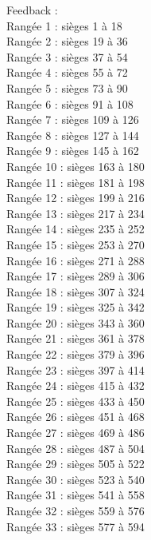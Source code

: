 \documentclass[letterpaper, 12pt]{article}
\begin{document}
Feedback : \\
Rang\'ee 1 : si\`eges 1 \`a 18\\
Rang\'ee 2 : si\`eges 19 \`a 36\\
Rang\'ee 3 : si\`eges 37 \`a 54\\
Rang\'ee 4 : si\`eges 55 \`a 72\\
Rang\'ee 5 : si\`eges 73 \`a 90\\
Rang\'ee 6 : si\`eges 91 \`a 108\\
Rang\'ee 7 : si\`eges 109 \`a 126\\
Rang\'ee 8 : si\`eges 127 \`a 144\\
Rang\'ee 9 : si\`eges 145 \`a 162\\
Rang\'ee 10 : si\`eges 163 \`a 180\\
Rang\'ee 11 : si\`eges 181 \`a 198\\
Rang\'ee 12 : si\`eges 199 \`a 216\\
Rang\'ee 13 : si\`eges 217 \`a 234\\
Rang\'ee 14 : si\`eges 235 \`a 252\\
Rang\'ee 15 : si\`eges 253 \`a 270\\
Rang\'ee 16 : si\`eges 271 \`a 288\\
Rang\'ee 17 : si\`eges 289 \`a 306\\
Rang\'ee 18 : si\`eges 307 \`a 324\\
Rang\'ee 19 : si\`eges 325 \`a 342\\
Rang\'ee 20 : si\`eges 343 \`a 360\\
Rang\'ee 21 : si\`eges 361 \`a 378\\
Rang\'ee 22 : si\`eges 379 \`a 396\\
Rang\'ee 23 : si\`eges 397 \`a 414\\
Rang\'ee 24 : si\`eges 415 \`a 432\\
Rang\'ee 25 : si\`eges 433 \`a 450\\
Rang\'ee 26 : si\`eges 451 \`a 468\\
Rang\'ee 27 : si\`eges 469 \`a 486\\
Rang\'ee 28 : si\`eges 487 \`a 504\\
Rang\'ee 29 : si\`eges 505 \`a 522\\
Rang\'ee 30 : si\`eges 523 \`a 540\\
Rang\'ee 31 : si\`eges 541 \`a 558\\
Rang\'ee 32 : si\`eges 559 \`a 576\\
Rang\'ee 33 : si\`eges 577 \`a 594\\
\end{document}
